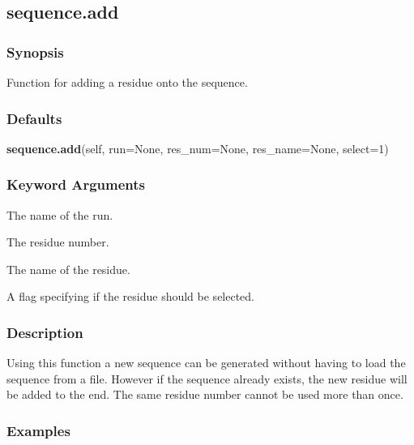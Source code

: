 


\newpage

\subsection{sequence.add}


\subsubsection{Synopsis}

Function for adding a residue onto the sequence.



\subsubsection{Defaults}

\textsf{\textbf{sequence.add}(self, run=None, res\_num=None, res\_name=None, select=1)}


\subsubsection{Keyword Arguments}

  The name of the run. 

  The residue number. 

  The name of the residue. 

  A flag specifying if the residue should be selected. 




\subsubsection{Description}

Using this function a new sequence can be generated without having to load the sequence from a file.  However if the sequence already exists, the new residue will be added to the end. The same residue number cannot be used more than once.



\subsubsection{Examples}


